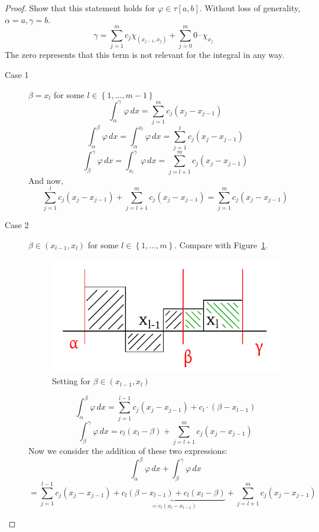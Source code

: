 \documentclass{article}
\newcommand{\set}[1]{\left\{#1\right\}}
\begin{document}
\begin{proof}
  Show that this statement holds for $\varphi \in \tau[a,b]$.
  Without loss of generality, $\alpha = a, \gamma = b$.
  \[ \gamma = \sum_{j=1}^m c_j \chi_{(x_{j-1}, x_j)} + \sum_{j=0}^m 0 \cdot \chi_{x_j} \]
  The zero represents that this term is not relevant for the integral in any way.
  \begin{description}
    \item[Case 1] 
      $\beta = x_l$ for some $l \in \set{1, \dots, m-1}$
      \[ \int_{\alpha}^\gamma \varphi \, dx = \sum_{j=1}^m c_j (x_j - x_{j-1}) \]
      \[ \int_{\alpha}^\beta \varphi \, dx = \int_{\alpha}^{x_l} \varphi \, dx = \sum_{j=1}^l c_j (x_j - x_{j-1}) \]
      \[ \int_{\beta}^\gamma \varphi \, dx = \int_{x_l}^{\gamma} \varphi \, dx = \sum_{j=l+1}^m c_j (x_j - x_{j-1}) \]
      And now,
      \[ \sum_{j=1}^l c_j (x_j - x_{j-1}) + \sum_{j=l+1}^m c_j (x_j - x_{j-1}) = \sum_{j=1}^m c_j (x_j - x_{j-1}) \]
    \item[Case 2]
      $\beta \in (x_{l-1}, x_l)$ for some $l \in \set{1, \ldots, m}$. Compare with Figure~\ref{img:step18}.
      \begin{figure}[t]
        \begin{center}
          \includegraphics{img/18_step.pdf}
          \caption{Setting for $\beta \in (x_{l-1}, x_l)$}
          \label{img:step18}
        \end{center}
      \end{figure}
      \[ \int_\alpha^\beta \varphi \, dx = \sum_{j=1}^{l-1} c_j (x_j - x_{j-1}) + c_l \cdot (\beta - x_{l-1}) \]
      \[ \int_\beta^\gamma \varphi \, dx = c_l(x_l - \beta)+ \sum_{j=l+1}^m c_j (x_j - x_{j-1}) \]
      Now we consider the addition of these two expressions:
      \[
        \int_{\alpha}^\beta \varphi \,dx + \int_\beta^\gamma \varphi \,dx
      \] \[
        = \sum_{j=1}^{l-1} c_j (x_j - x_{j-1}) + \underbrace{c_l(\beta - x_{l-1}) + c_l (x_l - \beta)}_{= c_l (x_l - x_{l-1})} + \sum_{j=l+1}^m c_j(x_j - x_{j-1})
\]
\end{description}
\end{proof}
\end{document}
